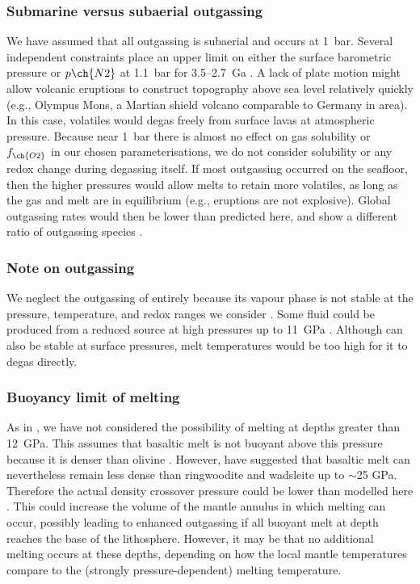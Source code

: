\subsubsection{Submarine versus subaerial outgassing}

We have assumed that all outgassing is subaerial and occurs at 1~bar. Several independent constraints place an upper limit on either the surface barometric pressure or $p\ch{N2}$ at 1.1~bar for 3.5--2.7~Ga \citep{Marty2013, Catling2020}. A lack of plate motion might allow volcanic eruptions to construct topography above sea level relatively quickly (e.g., Olympus Mons, a Martian shield volcano comparable to Germany in area). In this case, volatiles would degas freely from surface lavas at atmospheric pressure. Because near 1~bar there is almost no effect on gas solubility or $f_{\ch{O2}}$ in our chosen parameterisations, we do not consider solubility or any redox change during degassing itself. If most outgassing occurred on the seafloor, then the higher pressures would allow melts to retain more volatiles, as long as the gas and melt are in equilibrium (e.g., eruptions are not explosive). Global outgassing rates would then be lower than predicted here, and show a different ratio of outgassing species \citep{Gaillard2011}.


\subsubsection{Note on  outgassing}

We neglect the outgassing of  entirely because its vapour phase is not stable at the pressure, temperature, and redox ranges we consider \citep{zhang2009model, wetzel2013degassing, ramirez2014warming}. Some  fluid could be produced from a reduced source at high pressures up to 11~GPa \citep{Scott2004}. Although  can also be stable at surface pressures, melt temperatures would be too high for it to degas directly.


\subsubsection{Buoyancy limit of melting}

As in \citet{noack2014can, noack_volcanism_2017}, we have not considered the possibility of melting at depths greater than 12~GPa. This assumes that basaltic melt is not buoyant above this pressure because it is denser than olivine \citep{ohtani_melting_1995}. However, \citet{Mosenfelder2009} have suggested that basaltic melt can nevertheless remain less dense than ringwoodite and wadsleite up to $\sim$25 GPa. Therefore the actual density crossover pressure could be lower than modelled here \citep[e.g.,][]{Beuchert2013}. This could increase the volume of the mantle annulus in which melting can occur, possibly leading to enhanced outgassing if all buoyant melt at depth reaches the base of the lithosphere. However, it may be that no additional melting occurs at these depths, depending on how the local mantle temperatures compare to the (strongly pressure-dependent) melting temperature.


